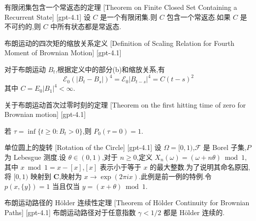 \documentclass[UTF8]{ctexart}
\begin{document}
    \begin{thm}
        {有限闭集包含一个常返态的定理}
        [Theorem on Finite Closed Set Containing a Recurrent State]
        [gpt-4.1]
        设 $C$ 是一个有限闭集.则 $C$ 包含一个常返态.如果 $C$ 是不可约的,则 $C$ 中所有状态都是常返态.
    \end{thm}
    
    
    
    \begin{dfn}
        {布朗运动的四次矩的缩放关系定义}
        [Definition of Scaling Relation for Fourth Moment of Brownian Motion]
        [gpt-4.1]
        
对于布朗运动 $B_t$,根据定义中的部分(b)和缩放关系,有
\[
{\mathcal{E}}_0 (|B_t - B_s|)^4 = {\mathcal{E}}_0 |B_{t-s}|^4 = C (t-s)^2
\]
其中 $C = E_0|B_1|^4 < \infty$.

    \end{dfn}
    
    
    
    \begin{thm}
        {关于布朗运动首次过零时刻的定理}
        [Theorem on the first hitting time of zero for Brownian motion]
        [gpt-4.1]
        
若 $\tau = \inf \{ t \geq 0 : B_{t} > 0 \}$,则 $P_{0} ( \tau = 0 ) = 1$.

    \end{thm}
    
    
    
    \begin{xmp}
        {单位圆上的旋转}
        [Rotation of the Circle]
        [gpt-4.1]
        设 $\Omega = [0, 1)$,$\mathcal{F}$ 是 Borel 子集,$P$ 为 Lebesgue 测度.设 $\theta \in (0, 1)$,对于 $n \geq 0$,定义 $X_{n}(\omega) = (\omega + n\theta) \bmod 1$,其中 $x \bmod 1 = x - [x]$,$[x]$ 表示小于等于 $x$ 的最大整数.为了说明其命名原因,将 $[0, 1)$ 映射到 $\mathbf{C}$,映射为 $x \to \exp(2\pi i x)$.此例是前一例的特例.令 $p(x, \{y\}) = 1$ 当且仅当 $y = (x + \theta) \bmod 1$.
    \end{xmp}
    
    
    
    \begin{thm}
        {布朗运动路径的 Hölder 连续性定理}
        [Theorem of Hölder Continuity for Brownian Paths]
        [gpt-4.1]
        布朗运动路径对于任意指数 $\gamma < 1/2$ 都是 Hölder 连续的.
    \end{thm}
    
\end{document}
